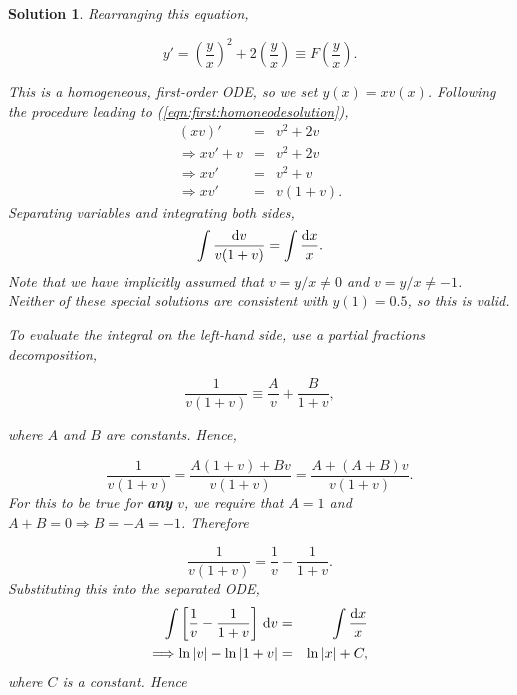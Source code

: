 \documentclass[a4paper]{report}
\newtheorem*{solution}{Solution}
\begin{document}
\begin{solution}
Rearranging this equation, 

\begin{displaymath}
y'=\left(\frac{y}{x}\right)^2+2\left(\frac{y}{x}\right) \equiv F\left(\frac{y}{x}\right).
\end{displaymath}

\noindent This is a homogeneous, first-order ODE, so we set $y(x)=xv(x)$. Following the procedure leading to (\ref{eqn:first:homoneodesolution}), 
\begin{eqnarray*}
\left(xv\right)' &=& v^2+2v \\
\Longrightarrow xv' + v &=& v^2 +2v\\
\Longrightarrow xv' &=& v^2+v\\
\Longrightarrow xv' &=& v(1+v).
\end{eqnarray*}
\noindent Separating variables and integrating both sides,
\begin{equation*}
\int \frac{{\rm d}v}{v(1+v)}=\int \frac{{\rm d}x}{x}.
\end{equation*}
\noindent Note that we have implicitly assumed that $v=y/x\neq0$ and $v=y/x\neq -1$. Neither of these special solutions are consistent with $y(1)=0.5$, so this is valid. 

\noindent To evaluate the integral on the left-hand side, use a partial fractions decomposition,

\begin{displaymath}
\frac{1}{v(1+v)}\equiv\frac{A}{v}+\frac{B}{1+v},
\end{displaymath}

\noindent where $A$ and $B$ are constants. Hence,

\begin{displaymath}
\frac{1}{v(1+v)} = \frac{A(1+v)+Bv}{v(1+v)} = \frac{A + (A+B)v}{v(1+v)}.
\end{displaymath}
\noindent For this to be true for {\bf any} $v$, we require that $A=1$ and $A+B=0 \Longrightarrow B=-A=-1$. Therefore

\begin{displaymath}
\frac{1}{v(1+v)}=\frac{1}{v}-\frac{1}{1+v}.
\end{displaymath}
\noindent Substituting this into the separated ODE, 
\begin{eqnarray*}
\int \left[\frac{1}{v}-\frac{1}{1+v}\right]\,\mathrm{d}v &=& \int \frac{{\rm d}x}{x}\\
\Longrightarrow \ln|v|-\ln|1+v|&=&\ln|x|+C,
\end{eqnarray*}
\noindent where $C$ is a constant. Hence


\end{solution}
\end{document}
